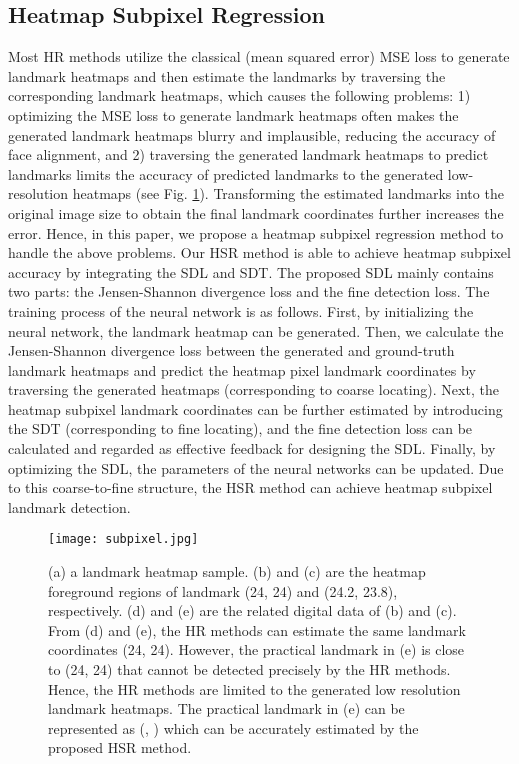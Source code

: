 \documentclass[journal]{IEEEtran}
\begin{document}
\subsection{Heatmap Subpixel Regression} Most HR methods \cite{Yang2017StackedHN, Dong2018StyleAN} utilize the classical (mean squared error) MSE loss to generate landmark heatmaps and then estimate the landmarks by traversing the corresponding landmark heatmaps, which causes the following problems: 1) optimizing the MSE loss to generate landmark heatmaps often makes the generated landmark heatmaps blurry and implausible, reducing the accuracy of face alignment, and 2) traversing the generated landmark heatmaps to predict landmarks limits the accuracy of predicted landmarks to the generated low-resolution heatmaps (see Fig. \ref{figp2}). Transforming the estimated landmarks into the original image size to obtain the final landmark coordinates further increases the error. Hence, in this paper, we propose a heatmap subpixel regression method to handle the above problems. Our HSR method is able to achieve heatmap subpixel accuracy by integrating the SDL and SDT. The proposed SDL mainly contains two parts: the Jensen-Shannon divergence loss and the fine detection loss. The training process of the neural network is as follows. First, by initializing the neural network, the landmark heatmap can be generated. Then, we calculate the Jensen-Shannon divergence loss between the generated and ground-truth landmark heatmaps and predict the heatmap pixel landmark coordinates by traversing the generated heatmaps (corresponding to coarse locating). Next, the heatmap subpixel landmark coordinates can be further estimated by introducing the SDT (corresponding to fine locating), and the fine detection loss can be calculated and regarded as effective feedback for designing the SDL. Finally, by optimizing the SDL, the parameters of the neural networks can be updated. Due to this coarse-to-fine structure, the HSR method can achieve heatmap subpixel landmark detection.
\begin{figure}[t]
	\begin{center}
		\texttt{[image: subpixel.jpg]}
	\end{center}
	\caption{(a) a landmark heatmap sample. (b) and (c) are the heatmap foreground regions of landmark (24, 24) and (24.2, 23.8), respectively. (d) and (e) are the related digital data of (b) and (c). From (d) and (e), the HR methods can estimate the same landmark coordinates (24, 24). However, the practical landmark in (e) is close to (24, 24) that cannot be detected precisely by the HR methods. Hence, the HR methods are limited to the generated low resolution landmark heatmaps. The practical landmark in (e) can be represented as (, ) which can be accurately estimated by the proposed HSR method.}
	\label{figp2}
\end{figure}
\end{document}
